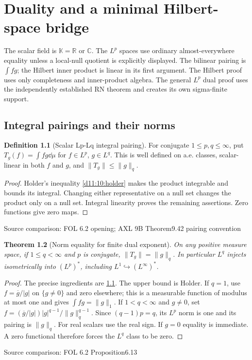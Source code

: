 \documentclass[11pt,oneside,openany]{book}
\newtheorem{theorem}{Theorem}[chapter]
\theoremstyle{definition}
\newtheorem{definition}[theorem]{Definition}
\theoremstyle{remark}
\newcommand{\R}{\mathbb R}\newcommand{\C}{\mathbb C}
\newcommand{\family}[1]{}
\newcommand{\source}[1]{\par\begingroup\small\sffamily\color{black!65}Source comparison: #1\par\endgroup}
\begin{document}


\chapter{Duality and a minimal Hilbert-space bridge}\label{ch:d11-20}

The scalar field is $\mathbb K=\R$ or $\C$. The $L^p$ spaces use ordinary almost-everywhere equality unless a local-null quotient is explicitly displayed. The bilinear pairing is $\int fg$; the Hilbert inner product is linear in its first argument. The Hilbert proof uses only completeness and inner-product algebra. The general $L^p$ dual proof uses the independently established RN theorem and creates its own sigma-finite support.

\section{Integral pairings and their norms}

\begin{definition}[Scalar Lp-Lq integral pairing]\family{D11.20.integral_pairing}\label{d11:20:integral-pairing}
For conjugate $1\le p,q\le\infty$, put $T_g(f)=\int fg\dd\mu$ for $f\in L^p$, $g\in L^q$. This is well defined on a.e. classes, scalar-linear in both $f$ and $g$, and $\|T_g\|\le\|g\|_q$.
\end{definition}
\begin{proof}
Holder's inequality \cref{d11:10:holder} makes the product integrable and bounds its integral. Changing either representative on a null set changes the product only on a null set. Integral linearity proves the remaining assertions. Zero functions give zero maps.
\end{proof}
\source{FOL 6.2 opening; AXL 9B Theorem9.42 pairing convention}

\begin{theorem}[Norm equality for finite dual exponent]\family{D11.20.pairing_norm_finite_q}\label{d11:20:pairing-norm-finite-q}
On any positive measure space, if $1\le q<\infty$ and $p$ is conjugate, $\|T_g\|=\|g\|_q$. In particular $L^q$ injects isometrically into $(L^p)^*$, including $L^1\hookrightarrow(L^\infty)^*$.
\end{theorem}
\begin{proof}
The precise ingredients are \cref{d11:20:integral-pairing}. The upper bound is Holder. If $q=1$, use $f=\overline g/|g|$ on $\{g\ne0\}$ and zero elsewhere; this is a measurable function of modulus at most one and gives $\int fg=\|g\|_1$. If $1<q<\infty$ and $g\ne0$, set $f=(\overline g/|g|)|g|^{q-1}/\|g\|_q^{q-1}$. Since $(q-1)p=q$, its $L^p$ norm is one and its pairing is $\|g\|_q$. For real scalars use the real sign. If $g=0$ equality is immediate. A zero functional therefore forces the $L^q$ class to be zero.
\end{proof}
\source{FOL 6.2 Proposition6.13}
\end{document}
